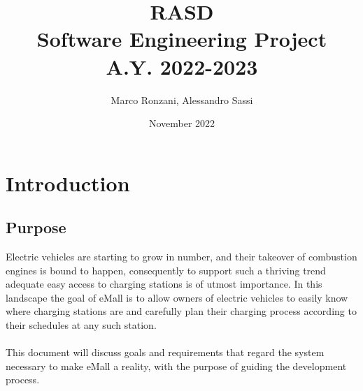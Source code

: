 \documentclass[11pt]{article}
\title{%
  \textbf{RASD} \\
  \large Software Engineering Project \\ A.Y. 2022-2023}
\author{Marco Ronzani, Alessandro Sassi}
\date{November 2022}
\begin{document}
\maketitle

\doublespacing
\tableofcontents
\singlespacing

\section{Introduction}
\label{section:introduction}

\subsection{Purpose}

Electric vehicles are starting to grow in number, and their takeover of combustion engines is bound to happen, consequently to support such a thriving trend adequate easy access to charging stations is of utmost importance. In this landscape the goal of eMall is to allow owners of electric vehicles to easily know where charging stations are and carefully plan their charging process according to their schedules at any such station.\\
\\
This document will discuss goals and requirements that regard the system necessary to make eMall a reality, with the purpose of guiding the development process.






\end{document}
